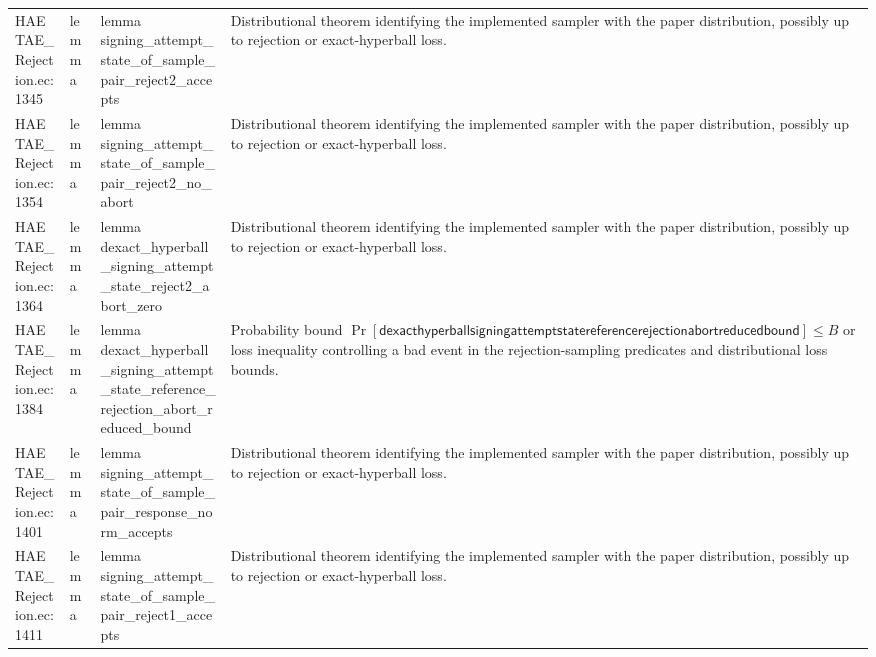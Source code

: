 \documentclass[10pt]{article}
\begin{document}
\begin{longtable}{L{0.11\textwidth}L{0.055\textwidth}L{0.385\textwidth}L{0.41\textwidth}}
HAETAE\_\allowbreak{}Rejection.\allowbreak{}ec:\allowbreak{}1345 & lemma & {\ttfamily\scriptsize lemma signing\_\allowbreak{}attempt\_\allowbreak{}state\_\allowbreak{}of\_\allowbreak{}sample\_\allowbreak{}pair\_\allowbreak{}reject2\_\allowbreak{}accepts} & Distributional theorem identifying the implemented sampler with the paper distribution, possibly up to rejection or exact-hyperball loss. \\
HAETAE\_\allowbreak{}Rejection.\allowbreak{}ec:\allowbreak{}1354 & lemma & {\ttfamily\scriptsize lemma signing\_\allowbreak{}attempt\_\allowbreak{}state\_\allowbreak{}of\_\allowbreak{}sample\_\allowbreak{}pair\_\allowbreak{}reject2\_\allowbreak{}no\_\allowbreak{}abort} & Distributional theorem identifying the implemented sampler with the paper distribution, possibly up to rejection or exact-hyperball loss. \\
HAETAE\_\allowbreak{}Rejection.\allowbreak{}ec:\allowbreak{}1364 & lemma & {\ttfamily\scriptsize lemma dexact\_\allowbreak{}hyperball\_\allowbreak{}signing\_\allowbreak{}attempt\_\allowbreak{}state\_\allowbreak{}reject2\_\allowbreak{}abort\_\allowbreak{}zero} & Distributional theorem identifying the implemented sampler with the paper distribution, possibly up to rejection or exact-hyperball loss. \\
HAETAE\_\allowbreak{}Rejection.\allowbreak{}ec:\allowbreak{}1384 & lemma & {\ttfamily\scriptsize lemma dexact\_\allowbreak{}hyperball\_\allowbreak{}signing\_\allowbreak{}attempt\_\allowbreak{}state\_\allowbreak{}reference\_\allowbreak{}rejection\_\allowbreak{}abort\_\allowbreak{}reduced\_\allowbreak{}bound} & Probability bound $\Pr[\mathsf{dexacthyperballsigningattemptstatereferencerejectionabortreducedbound}]\le B$ or loss inequality controlling a bad event in the rejection-sampling predicates and distributional loss bounds. \\
HAETAE\_\allowbreak{}Rejection.\allowbreak{}ec:\allowbreak{}1401 & lemma & {\ttfamily\scriptsize lemma signing\_\allowbreak{}attempt\_\allowbreak{}state\_\allowbreak{}of\_\allowbreak{}sample\_\allowbreak{}pair\_\allowbreak{}response\_\allowbreak{}norm\_\allowbreak{}accepts} & Distributional theorem identifying the implemented sampler with the paper distribution, possibly up to rejection or exact-hyperball loss. \\
HAETAE\_\allowbreak{}Rejection.\allowbreak{}ec:\allowbreak{}1411 & lemma & {\ttfamily\scriptsize lemma signing\_\allowbreak{}attempt\_\allowbreak{}state\_\allowbreak{}of\_\allowbreak{}sample\_\allowbreak{}pair\_\allowbreak{}reject1\_\allowbreak{}accepts} & Distributional theorem identifying the implemented sampler with the paper distribution, possibly up to rejection or exact-hyperball loss. \\

\end{longtable}
\end{document}
